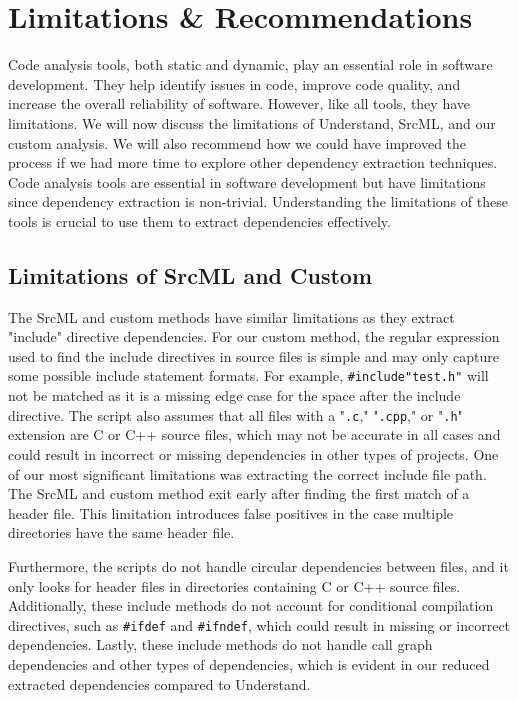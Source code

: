 \documentclass[12pt, dvipsnames, a4paper]{article}
\newcommand{\code}[1]{\texttt{#1}}
\begin{document}
\section{Limitations \& Recommendations}
Code analysis tools, both static and dynamic, play an essential role in software development. They help identify issues in code, improve code quality, and increase the overall reliability of software. However, like all tools, they have limitations. We will now discuss the limitations of Understand, SrcML, and our custom analysis. We will also recommend how we could have improved the process if we had more time to explore other dependency extraction techniques. Code analysis tools are essential in software development but have limitations since dependency extraction is non-trivial. Understanding the limitations of these tools is crucial to use them to extract dependencies effectively.

\subsection{Limitations of SrcML and Custom}
The SrcML and custom methods have similar limitations as they extract "include" directive dependencies. For our custom method, the regular expression used to find the include directives in source files is simple and may only capture some possible include statement formats. For example, \code{\#include"test.h"} will not be matched as it is a missing edge case for the space after the include directive. The script also assumes that all files with a "\code{.c}," "\code{.cpp}," or "\code{.h}" extension are C or C++ source files, which may not be accurate in all cases and could result in incorrect or missing dependencies in other types of projects. One of our most significant limitations was extracting the correct include file path. The SrcML and custom method exit early after finding the first match of a header file. This limitation introduces false positives in the case multiple directories have the same header file.

Furthermore, the scripts do not handle circular dependencies between files, and it only looks for header files in directories containing C or C++ source files. Additionally, these include methods do not account for conditional compilation directives, such as \code{\#ifdef} and \code{\#ifndef}, which could result in missing or incorrect dependencies. Lastly, these include methods do not handle call graph dependencies and other types of dependencies, which is evident in our reduced extracted dependencies compared to Understand.
\end{document}

